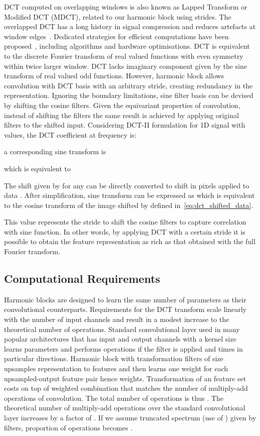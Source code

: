 \documentclass[12pt,a4paper]{article}
\begin{document}
DCT computed on overlapping windows is also known as Lapped Transform or Modified DCT (MDCT), related to our harmonic block using strides. The overlapped DCT has a long history in signal compression and reduces artefacts at window edges~\cite{Malvar90}. Dedicated strategies for efficient computations have been proposed~\cite{Malvar90}, including algorithms and hardware optimisations. DCT is equivalent to the discrete Fourier transform of real valued functions with even symmetry within twice larger window. DCT lacks imaginary component given by the sine transform of real valued odd functions. However, harmonic block allows convolution with DCT basis with an arbitrary stride, creating redundancy in the representation. Ignoring the boundary limitations, sine filter basis can be devised by shifting the cosine filters. Given the equivariant properties of convolution, instead of shifting the filters the same result is achieved by applying original filters to the shifted input. Considering DCT-II formulation for 1D signal  with  values, the DCT coefficient at frequency  is:

a corresponding sine transform is

which is equivalent to

The shift given by  for any  can be directly converted to shift in pixels applied to data . After simplification, sine transform can be expressed as 
which is equivalent to the cosine transform of the image shifted by  defined in~\eqref{eq:dct_shifted_data}. 

This value represents the stride to shift the cosine filters to capture correlation with sine function. 
In other words, by applying DCT with a certain stride it is possible to obtain the feature representation as rich as that obtained with the full Fourier transform.

\subsection{Computational Requirements} \label{sec:methodrequirements}

Harmonic blocks are designed to learn the same number of parameters as their convolutional counterparts. Requirements for the DCT transform scale linearly with the number of input channels and result in a modest increase to the theoretical number of operations. Standard convolutional layer used in many popular architectures that has  input and  output channels with a kernel size  learns  parameters and performs  operations if the filter is applied  and  times in particular directions. Harmonic block with  transformation filters of size  upsamples representation to  features and then learns one weight for each upsampled-output feature pair hence  weights. Transformation of an  feature set costs  on top of weighted combination  that matches the number of multiply-add operations of  convolution. The total number of operations is thus . The theoretical number of multiply-add operations over the standard convolutional layer increases by a factor of . If we assume truncated spectrum (use of ) given by  filters, proportion of operations becomes .
\end{document}
